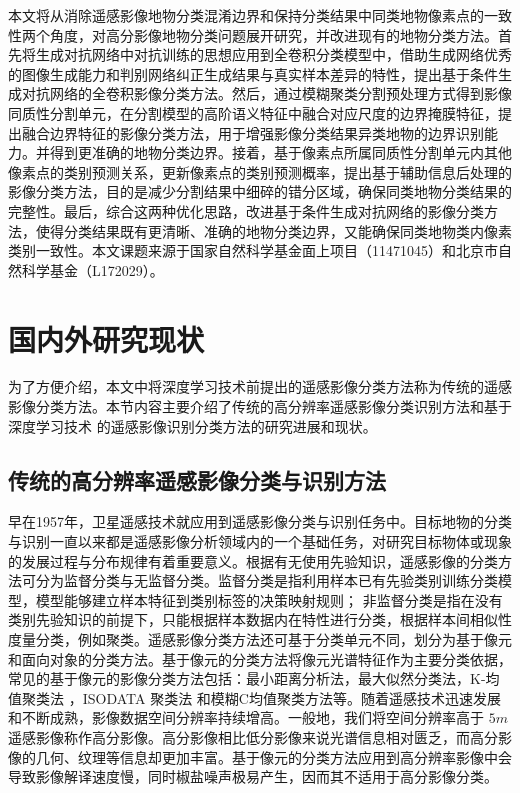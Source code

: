 本文将从消除遥感影像地物分类混淆边界和保持分类结果中同类地物像素点的一致性两个角度，对高分影像地物分类问题展开研究，并改进现有的地物分类方法。首先将生成对抗网络中对抗训练的思想应用到全卷积分类模型中，借助生成网络优秀的图像生成能力和判别网络纠正生成结果与真实样本差异的特性，提出基于条件生成对抗网络的全卷积影像分类方法。然后，通过模糊聚类分割预处理方式得到影像同质性分割单元，在分割模型的高阶语义特征中融合对应尺度的边界掩膜特征，提出融合边界特征的影像分类方法，用于增强影像分类结果异类地物的边界识别能力。并得到更准确的地物分类边界。接着，基于像素点所属同质性分割单元内其他像素点的类别预测关系，更新像素点的类别预测概率，提出基于辅助信息后处理的影像分类方法，目的是减少分割结果中细碎的错分区域，确保同类地物分类结果的完整性。最后，综合这两种优化思路，改进基于条件生成对抗网络的影像分类方法，使得分类结果既有更清晰、准确的地物分类边界，又能确保同类地物类内像素类别一致性。本文课题来源于国家自然科学基金面上项目（11471045）和北京市自然科学基金（L172029）。




\section{国内外研究现状}
\label{sec:second}
为了方便介绍，本文中将深度学习技术前提出的遥感影像分类方法称为传统的遥感影像分类方法。本节内容主要介绍了传统的高分辨率遥感影像分类识别方法和基于深度学习技术\citep{hinton2006fast, bengio2009learning, NIPS2012_4824} 的遥感影像识别分类方法的研究进展和现状。

\subsection{传统的高分辨率遥感影像分类与识别方法}
\label{subsec:1-2-1}
早在1957年，卫星遥感技术就应用到遥感影像分类与识别任务中。目标地物的分类与识别一直以来都是遥感影像分析领域内的一个基础任务，对研究目标物体或现象的发展过程与分布规律有着重要意义\cite{jensen1987introductory}。根据有无使用先验知识，遥感影像的分类方法可分为监督分类与无监督分类。监督分类是指利用样本已有先验类别训练分类模型，模型能够建立样本特征到类别标签的决策映射规则； 非监督分类是指在没有类别先验知识的前提下，只能根据样本数据内在特性进行分类，根据样本间相似性度量分类，例如聚类\cite{djukanovic1993unsupervised}。遥感影像分类方法还可基于分类单元不同，划分为基于像元和面向对象的分类方法。基于像元的分类方法将像元光谱特征作为主要分类依据，常见的基于像元的影像分类方法包括：最小距离分析法\cite{wacker1972minimum}，最大似然分类法\cite{strahler1980use}，K-均值聚类法\cite{atkinson2000geostatistical} ，ISODATA 聚类法\cite{paul2002new} 和模糊C均值聚类方法\cite{bezdek1984fcm}等。随着遥感技术迅速发展和不断成熟，影像数据空间分辨率持续增高。一般地，我们将空间分辨率高于 $5m$ 遥感影像称作高分影像\cite{zhangyongsheng2004}。高分影像相比低分影像来说光谱信息相对匮乏，而高分影像的几何、纹理等信息却更加丰富。基于像元的分类方法应用到高分辨率影像中会导致影像解译速度慢，同时椒盐噪声极易产生，因而其不适用于高分影像分类\cite{blaschke2010object}。

